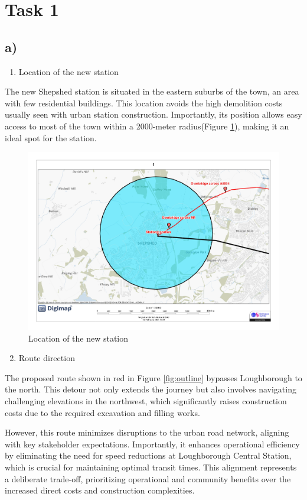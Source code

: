 \documentclass[letterpaper,12pt,leqno]{article}
\begin{document}
	
	\section{Task 1}\label{task-1}
	
	\subsection{a)}
	
	\begin{enumerate}
		\def\labelenumi{\arabic{enumi}.}
		\item
		Location of the new station
	\end{enumerate}
	
	The new Shepshed station is situated in the eastern suburbs of the town, an area with few residential buildings. This location avoids the high demolition costs usually seen with urban station construction. Importantly, its position allows easy access to most of the town within a 2000-meter radius(Figure \ref{fig:radius}), making it an ideal spot for the station. 
	
	\begin{figure}[H]
		\centering
		\includegraphics[width=0.6\linewidth]{digimap_roam.jpg}
		\caption{Location of the new station}
		\label{fig:radius}
	\end{figure}
		
	\begin{enumerate}
		\setcounter{enumi}{1}
		\item
		Route direction
	\end{enumerate}
	
	The proposed route shown in red in Figure \ref{fig:outline} bypasses Loughborough to the north. This detour not only extends the journey but also involves navigating challenging elevations in the northwest, which significantly raises construction costs due to the required excavation and filling works.
 
	However, this route minimizes disruptions to the urban road network, aligning with key stakeholder expectations. Importantly, it enhances operational efficiency by eliminating the need for speed reductions at Loughborough Central Station, which is crucial for maintaining optimal transit times. This alignment represents a deliberate trade-off, prioritizing operational and community benefits over the increased direct costs and construction complexities.
	
\end{document}
